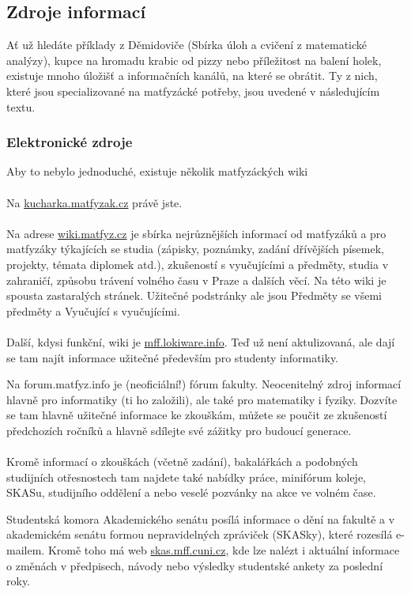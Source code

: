 \subsection{Zdroje informací}
Ať už hledáte příklady z Děmidoviče (Sbírka úloh a cvičení z matematické
analýzy), kupce na hromadu krabic od pizzy nebo příležitost na balení holek,
existuje mnoho úložišť a informačních kanálů, na které se obrátit. Ty z nich,
které jsou specializované na matfyzácké potřeby, jsou uvedené v následujícím
textu.


\subsubsection{Elektronické zdroje}
Aby to nebylo jednoduché, existuje několik matfyzáckých wiki
\\\\
Na \url{kucharka.matfyzak.cz} právě jste.
\\\\
Na adrese \url{wiki.matfyz.cz} je sbírka nejrůznějších informací od matfyzáků a
pro matfyzáky týkajících se studia (zápisky, poznámky, zadání dřívějších
písemek, projekty, témata diplomek atd.), zkušeností s vyučujícími a předměty,
studia v zahraničí, způsobu trávení volného času v Praze a dalších věcí. Na této
wiki je spousta zastaralých stránek. Užitečné podstránky ale jsou Předměty se
všemi předměty a Vyučující s vyučujícími.
\\\\
Další, kdysi funkční, wiki je \url{mff.lokiware.info}. Teď už není aktulizovaná,
ale dají se tam najít informace užitečné především pro studenty informatiky.


Na forum.matfyz.info je (neoficiální!) fórum fakulty. Neocenitelný zdroj
informací hlavně pro informatiky (ti ho založili), ale také pro matematiky i
fyziky. Dozvíte se tam hlavně užitečné informace ke zkouškám, můžete se poučit
ze zkušeností předchozích ročníků a hlavně sdílejte své zážitky pro budoucí
generace.
\\\\
Kromě informací o zkouškách (včetně zadání), bakalářkách a podobných studijních
otřesnostech tam najdete také nabídky práce, minifórum koleje, SKASu, studijního
oddělení a nebo veselé pozvánky na akce ve volném čase.


Studentská komora Akademického senátu posílá informace o dění na fakultě a v
akademickém senátu formou nepravidelných zpráviček (SKASky), které rozesílá
e-mailem. Kromě toho má web \url{skas.mff.cuni.cz}, kde lze nalézt i aktuální
informace o změnách v předpisech, návody nebo výsledky studentské ankety za
poslední roky.


